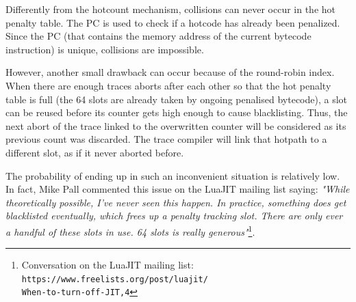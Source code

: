 \noindent
Differently from the hotcount mechanism, collisions can never occur in the hot penalty table. The PC is used to check if a hotcode has already been penalized. Since the PC (that contains the memory address of the current bytecode instruction) is unique, collisions are impossible.

However, another small drawback can occur because of the round-robin index. When there are enough traces aborts after each other so that the hot penalty table is full (the 64 slots are already taken by ongoing penalised bytecode), a slot can be reused before its counter gets high enough to cause blacklisting. Thus, the next abort of the trace linked to the overwritten counter will be considered as its previous count was discarded. The trace compiler will link that hotpath to a different slot, as if it never aborted before. 

The probability of ending up in such an inconvenient situation is relatively low. In fact, Mike Pall commented this issue on the LuaJIT mailing list saying: \textit{"While theoretically possible, I've never seen this happen. In practice, something does get blacklisted eventually, which frees up a penalty tracking slot. There are only ever a handful of these slots in use. 64 slots is really generous"}\footnote{Conversation on the LuaJIT mailing list: \texttt{https://www.freelists.org/post/luajit/\\When-to-turn-off-JIT,4}}.

